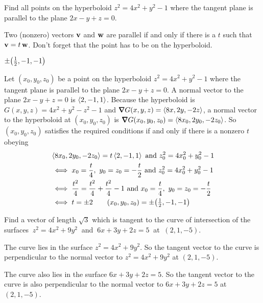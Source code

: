 \begin{question}[M226 2009D] %
Find all points on the hyperboloid $z^2=4x^2+y^2-1$
where the tangent plane is parallel to the plane $2x-y+z=0$.
\end{question}

\begin{hint}
Two (nonzero) vectors $\mathbf{v}$ and $\mathbf{w}$ are parallel if and only if there  
is a $t$ such that $\mathbf{v}=t\,\mathbf{w}$.
Don't forget that the point has to be on the hyperboloid.
\end{hint}

\begin{answer}
$\pm \big(\tfrac{1}{2},-1,-1\big)$
\end{answer}

\begin{solution} 
Let $(x_0,y_0,z_0)$  be a point on the hyperboloid $z^2=4x^2+y^2-1$
where the tangent plane is parallel to the plane $2x-y+z=0$. A normal vector
to the plane $2x-y+z=0$ is $\left< 2,-1,1\right>$. Because the hyperboloid is
$G(x,y,z)=4x^2+y^2-z^2-1$ and $\vnabla G(x,y,z) = \llt 8x,2y,-2z\rgt$,
 a normal vector to the hyperboloid at $(x_0,y_0,z_0)$ is 
$\vnabla G(x_0,y_0,z_0)=\llt 8x_0,2y_0,-2z_0\rgt$. 
So $(x_0,y_0,z_0)$ satisfies the required conditions if and only if there is a nonzero $t$ obeying
\begin{align*}
&\left< 8x_0,2y_0,-2z_0\right> =t\left< 2,-1,1\right> \text{ and }
 z_0^2=4x_0^2+y_0^2-1\\
&\iff x_0=\frac{t}{4},\ y_0=z_0=-\frac{t}{2}\text{ and }
 z_0^2=4x_0^2+y_0^2-1\\
&\iff \frac{t^2}{4}= \frac{t^2}{4}+ \frac{t^2}{4}-1\text{ and }
     x_0=\frac{t}{4},\ y_0=z_0=-\frac{t}{2}\\
& \iff t=\pm 2\qquad
(x_0,y_0,z_0)=\pm \big(\tfrac{1}{2},-1,-1\big)
\end{align*}

\end{solution}

\begin{question}
Find a vector of length $\sqrt{3}$ which is tangent to the curve of
intersection of the surfaces $\ z^2=4x^2+9y^2\ $ and $\ 6x+3y+2z=5\ $ at $\ (2,1,-5)$.
\end{question}

\begin{hint}
The curve lies in the surface $z^2=4x^2+9y^2$. So the tangent vector to the
curve is perpendicular to the normal vector to $z^2=4x^2+9y^2$ at $(2,1,-5)$.

The curve also lies in the surface $6x+3y+2z=5$. So the tangent vector to the
curve is also perpendicular to the normal vector to $6x+3y+2z=5$ at $(2,1,-5)$.
\end{hint}

